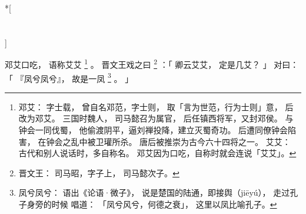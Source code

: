 
\switchcolumn[0]*[\section{}]

邓艾口吃，
语称艾艾%
\footnote{%
    邓艾：
        字士载，
        曾自名邓范，字士则，
        取「言为世范，行为士则」意，
        后改为邓艾。
        三国时魏人，
        司马懿召为属官，
        后任镇西将军，又封邓侯。
        与钟会一同伐蜀，
        他偷渡阴平，逼刘禅投降，建立灭蜀奇功。
        后遭同僚钟会陷害，
        在钟会之乱中被卫瓘所杀。
        唐后被推崇为古今六十四将之一。
    艾艾：
        古代和别人说话时，多自称名。
        邓艾因为口吃，自称时就会连说「艾艾」。
}%
。
晋文王戏之曰%
\footnote{%
    晋文王：
        司马昭，字子上，
        司马懿次子。
}%
：「
    卿云艾艾，
    定是几艾？
」
对曰：「
    『凤兮凤兮』，
    故是一凤%
    \footnote{%
        凤兮凤兮：
            语出《论语·微子》，
            说是楚国的陆通，即接舆（jiēyú），
            走过孔子身旁的时候
            唱道：
            「凤兮风兮，何德之衰」，
            这里以凤比喻孔子。
    }%
    。
」

\switchcolumn


